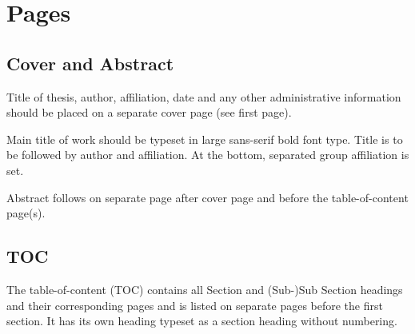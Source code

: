 \documentclass[11pt, a4paper,oneside,chapterprefix=false]{scrbook}
\begin{document}
\chapter*{Pages}


\section*{Cover and Abstract}

Title of thesis, author, affiliation, date and any other administrative information should be placed on a separate cover page (see first page).

Main title of work should be typeset in large sans-serif bold font type. Title is to be followed by author and affiliation. At the bottom, separated group affiliation is set.

Abstract follows on separate page after cover page and before the table-of-content page(s).


\section*{TOC}

The table-of-content (TOC) contains all Section and (Sub-)Sub Section headings and their corresponding pages and is listed on separate pages before the first section. It has its own heading typeset as a section heading without numbering.

%



\end{document}

